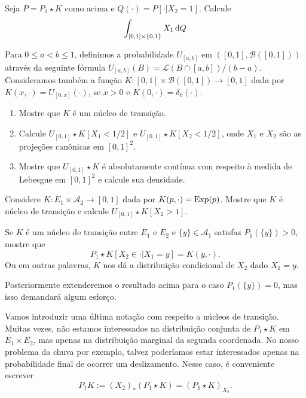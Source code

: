\begin{exercise}
  Seja $P = P_1 \star K$ como acima e $Q(\cdot) = P[\cdot | X_2 = 1]$.
  Calcule
  \begin{equation}
    \int_{[0,1] \times \{0,1\}} X_1 \mathop{}\!\mathrm{d} Q
  \end{equation}
\end{exercise}

\begin{exercise}
  Para $0 \leq a < b \leq 1$, definimos a probabilidade $U_{[a,b]}$ em $([0,1], \mathcal{B}([0,1]))$ através da seguinte fórmula $U_{[a,b]}(B) = \mathcal{L}(B \cap [a,b])/(b-a)$.
  Consideramos também a função $K:[0,1] \times \mathcal{B}([0,1]) \to [0,1]$ dada por $K(x, \cdot) = U_{[0,x]} (\cdot)$, se $x > 0$ e $K(0, \cdot) = \delta_0(\cdot)$.
  \begin{enumerate}[\quad a)]
  \item Mostre que $K$ é um núcleo de transição.
  \item Calcule $U_{[0,1]} \star K [X_1 < 1/2]$ e $U_{[0,1]} \star K [X_2 < 1/2]$, onde $X_1$ e $X_2$ são as projeções canônicas em $[0,1]^2$.
  \item Mostre que $U_{[0,1]} \star K$ é absolutamente contínua com respeito à medida de Lebesgue em $[0,1]^2$ e calcule sua densidade.
\end{enumerate}

\end{exercise}

\begin{exercise}
  Considere $K:E_1 \times \mathcal{A}_2 \to [0,1]$ dada por $K(p, \cdot) = \operatorname{Exp}(p)$.
  Mostre que $K$ é núcleo de transição e calcule $U_{[0,1]} \star K [X_2 > 1]$.
\end{exercise}

\begin{exercise}
  Se $K$ é um núcleo de transição entre $E_1$ e $E_2$ e $\{y\} \in \mathcal{A}_1$ satisfaz $P_1(\{y\}) > 0$, mostre que
  \begin{equation}
    P_1 \star K [X_2 \in \cdot | X_1 = y] = K(y, \cdot).
  \end{equation}
  Ou em outras palavras, $K$ nos dá a distribuição condicional de $X_2$ dado $X_1 = y$.
\end{exercise}

Posteriormente extenderemos o resultado acima para o caso $P_1(\{y\}) = 0$, mas isso demandará algum esforço.

Vamos introduzir uma última notação com respeito a núcleos de transição.
Muitas vezes, não estamos interessados na distribuição conjunta de $P_1 \star K$ em $E_1 \times E_2$, mas apenas na distribuição marginal da segunda coordenada.
No nosso problema da chuva por exemplo, talvez poderíamos estar interessados apenas na probabilidade final de ocorrer um deslizamento.
Nesse caso, é conveniente escrever
\begin{equation}
  \label{e:P1_K}
  P_1 K := (X_2)_*(P_1 \star K) = (P_1 \star K)_{X_2}.
\end{equation}

